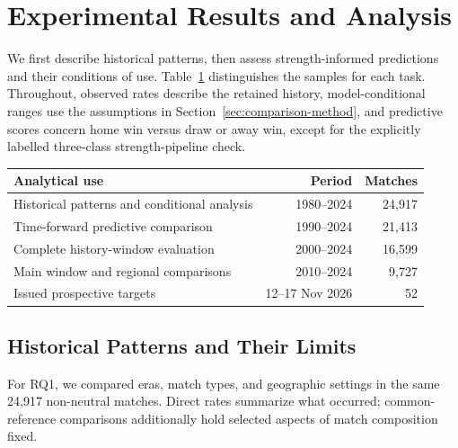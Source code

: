 \section{Experimental Results and Analysis}
\label{sec:results}

We first describe historical patterns, then assess strength-informed predictions and their conditions of use. Table~\ref{tab:analysis-samples} distinguishes the samples for each task. Throughout, observed rates describe the retained history, model-conditional ranges use the assumptions in Section~\ref{sec:comparison-method}, and predictive scores concern home win versus draw or away win, except for the explicitly labelled three-class strength-pipeline check.

\begin{table}[htbp]
\centering\small
{}
\label{tab:analysis-samples}
\begin{tabularx}{\linewidth}{@{}Xrr@{}}
\toprule
Analytical use & Period & Matches \\
\midrule
Historical patterns and conditional analysis & 1980--2024 & 24,917 \\
Time-forward predictive comparison & 1990--2024 & 21,413 \\
Complete history-window evaluation & 2000--2024 & 16,599 \\
Main window and regional comparisons & 2010--2024 & 9,727 \\
Issued prospective targets & 12--17 Nov 2026 & 52 \\
\bottomrule
\end{tabularx}
\end{table}

\subsection{Historical Patterns and Their Limits}
\label{sec:historical-results}

For RQ1, we compared eras, match types, and geographic settings in the same 24,917 non-neutral matches. Direct rates summarize what occurred; common-reference comparisons additionally hold selected aspects of match composition fixed.

